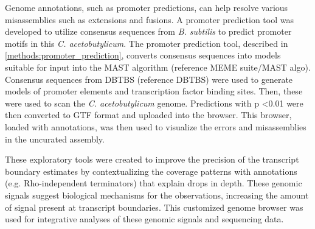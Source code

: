 Genome annotations, such as promoter predictions, can help resolve various misassemblies such as extensions and fusions. A promoter prediction tool was developed to utilize consensus sequences from \textit{B. subtilis} to predict promoter motifs in this \textit{C. acetobutylicum}. The promoter prediction tool, described in \ref{methods:promoter_prediction}, converts consensus sequences into models suitable for input into the MAST algorithm (reference MEME suite/MAST algo). Consensus sequences from DBTBS (reference DBTBS) were used to generate models of promoter elements and transcription factor binding sites. Then, these were used to scan the \textit{C. acetobutylicum} genome. Predictions with p \textless 0.01 were then converted to GTF format and uploaded into the browser. This browser, loaded with annotations, was then used to visualize the errors and misassemblies in the uncurated assembly.

These exploratory tools were created to improve the precision of the transcript boundary estimates by contextualizing the coverage patterns with annotations (e.g. Rho-independent terminators) that explain drops in depth. These genomic signals suggest biological mechanisms for the observations, increasing the amount of signal present at transcript boundaries. This customized genome browser was used for integrative analyses of these genomic signals and sequencing data. 




